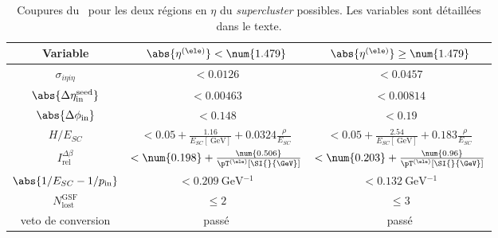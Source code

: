 \begin{table}[h]
\centering
\begin{tabular}{ccc}
\toprule
Variable & $\abs{\eta^{(\ele)}} < \num{1.479}$ & $\abs{\eta^{(\ele)}} \geq \num{1.479}$ \\
\midrule
$\sigma_{i\eta i\eta}$ & $<\num{0.0126}$ & $<\num{0.0457}$ \\
$\abs{\Delta\eta_\text{in}^\text{seed}}$ & $<\num{0.00463}$ & $<\num{0.00814}$ \\
$\abs{\Delta\phi_\text{in}}$ & $<\num{0.148}$ & $<\num{0.19}$ \\
$H/E_{SC}$ & $<\num{0.05}+\frac{\num{1.16}}{E_{SC} [\SI{}{\GeV}]} + \num{0.0324}\frac{\rho}{E_{SC}}$ & $<\num{0.05}+\frac{\num{2.54}}{E_{SC} [\SI{}{\GeV}]} + \num{0.183}\frac{\rho}{E_{SC}}$ \\
$I_\text{rel}^{\Delta\beta}$ & $<\num{0.198} + \frac{\num{0.506}}{\pT^{(\ele)} [\SI{}{\GeV}]}$ & $<\num{0.203} + \frac{\num{0.96}}{\pT^{(\ele)} [\SI{}{\GeV}]}$ \\
$\abs{1/E_{SC}-1/p_\text{in}}$ & $<\SI{0.209}{\GeV^{-1}}$ & $<\SI{0.132}{\GeV^{-1}}$ \\
$N_\text{lost}^\text{GSF}$ & $\leq\num{2}$ & $\leq\num{3}$ \\
veto de conversion & passé & passé \\
\bottomrule
\end{tabular}
\caption[Coupures du \CutBasedEleIDVeto.]{Coupures du \CutBasedEleIDVeto\ pour les deux régions en $\eta$ du \emph{supercluster} possibles. Les variables sont détaillées dans le texte.}
\label{tab-CutBasedEleIDVeto}
\end{table}
